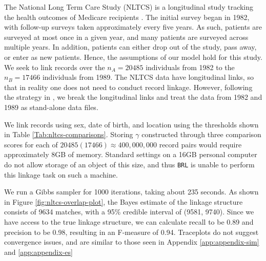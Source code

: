 \documentclass[ba]{imsart}
\begin{document}
	The National Long Term Care Study (NLTCS) is a longitudinal study tracking the health outcomes of Medicare recipients \citep{steorts_bayesian_2016}. The initial survey began in 1982, with follow-up surveys taken approximately every five years. As such, patients are surveyed at most once in a given year, and many patients are surveyed across multiple years. In addition, patients can either drop out of the study, pass away, or enter as new patients. Hence, the assumptions of our model hold for this study. We seek to link records over the $n_A = 20485$ individuals from 1982 to the $n_B = 17466$ individuals from 1989. The NLTCS data have longitudinal links, so that in reality one does not need to conduct record linkage. However, following the strategy in \cite{guha:reiter:BA}, we break the longitudinal links and treat the data from 1982 and 1989 as stand-alone data files.
	
	We link records using sex, date of birth, and location using the thresholds shown in Table \ref{Tab:nltcs-comparisons}. Storing $\gamma$ constructed through three comparison scores for each of $20485 (17466) \approx 400,000,000$ record pairs would require approximately 8GB of memory. Standard settings on a 16GB personal computer do not allow storage of an object of this size, and thus \texttt{BRL} is unable to perform this linkage task on such a machine. {}
	
	We run a Gibbs sampler for 1000 iterations, taking about 235 seconds. As shown in Figure \ref{fig:nltcs-overlap-plot}, the Bayes estimate of the linkage structure consists of 9634 matches, with a 95\% credible interval of (9581, 9740). Since we have access to the true linkage structure, we can calculate recall to be 0.89 and precision to be 0.98, resulting in an F-measure of 0.94. Traceplots do not suggest convergence issues, and are similar to those seen in Appendix \ref{app:appendix-sim} and \ref{app:appendix-es}
	
\end{document}

